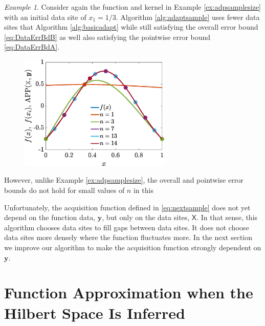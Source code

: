 \documentclass[]{mcom-l}
\theoremstyle{remark}
\newtheorem{example}{Example}
\newcommand{\mX}{\mathsf{X}}
\newcommand{\by}{{\boldsymbol{y}}}
\begin{document}
\begin{example}
\label{ex:adpdataselect}
Consider again the function and kernel in Example \ref{ex:adpsamplesize} with an initial data site of $x_1=1/3$.
Algorithm \ref{alg:adaptsample} uses fewer data sites that Algorithm \ref{alg:basicadapt} while still satisfying the overall error bound \eqref{eq:DataErrBdB} as well also satisfying the pointwise error bound \eqref{eq:DataErrBdA}.
	
		
	
	
	\begin{figure}[H]
		\centering
		\includegraphics[height = 5.5cm]{ProgramsImages/SimpleFunAlg2.eps}
		\caption{ \label{fig:ex1}}
	\end{figure}
	
\end{example}

However, unlike Example  \ref{ex:adpsamplesize}, the overall and pointwise error bounds do not hold for small values of $n$ in this



Unfortunately, the acquisition function defined in \eqref{eq:nextsample} does not yet depend on the function data, $\by$, but only on the data sites, $\mX$.  In that sense, this algorithm chooses data sites to fill gaps between data sites.  It does not choose data sites more densely where the function  fluctuates more.  In the next section we improve our algorithm to make the acquisition function strongly dependent on $\by$.





\section{Function Approximation when the Hilbert Space Is Inferred} \label{sec:adaptF}
\end{document}
